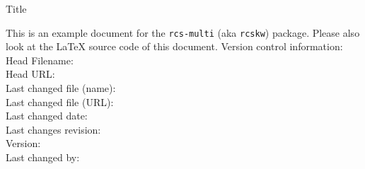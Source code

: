 \documentclass[12pt]{report}
\begin{document}
\begin{titlepage}
 \hbox{}
 \vspace{8ex}
 {\huge Title\par}
 \vspace{2ex}
 {\large \noindent This is an example document for the \texttt{rcs-multi} (aka
 \texttt{rcskw}) package. Please also look at the LaTeX source code of this
 document.}
 \vfill
 \flushleft\sffamily
 Version control information:\\
 Head Filename: \rcsnolinkurl{\rcsmainfilename}\\
 Head URL: \rcsnolinkurl{\rcsmainfileurl}\\
 Last changed file (name): \rcsnolinkurl{\rcsname}\\
 Last changed file (URL): \rcsnolinkurl{\rcsurl}\\
 Last changed date: \rcsdate\\
 Last changes revision: \rcsrev\\
 Version: \rcsFullRevision*{\rcsrev}\\
 Last changed by: \rcsFullAuthor*{\rcsauthor}\\
\end{titlepage}



%
\end{document}
